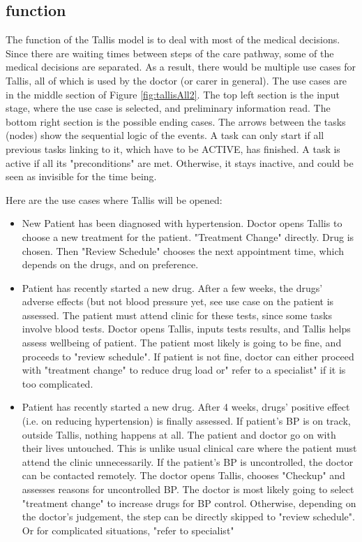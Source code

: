 \documentclass[11pt]{article}
\begin{document}
\subsection{function}
The function of the Tallis model is to deal with most of the medical decisions. Since there are waiting times between steps of the care pathway, some of the medical decisions are separated.  As a result, there would be multiple use cases for Tallis, all of which is used by the doctor (or carer in general). The use cases are in the middle section of Figure \ref{fig:tallisAll2}.  The top left section is the input stage, where the use case is selected, and preliminary information read.   The bottom right section is the possible ending cases. The arrows between the tasks (nodes) show the sequential logic of the events. A task can only start if all  previous tasks  linking to it, which have to be ACTIVE, has finished. A task is active if all its "preconditions" are met.  Otherwise, it stays inactive, and could be seen as invisible for the time being. 

Here are the use cases where Tallis will be opened:
\begin{itemize}
\item New Patient has been diagnosed with hypertension. Doctor opens Tallis to choose a new treatment for the patient.  "Treatment Change" directly.  Drug is chosen.  Then "Review Schedule" chooses the next appointment time, which depends on the drugs, and on preference.  

\item Patient has recently started a new drug.  After a few weeks, the drugs' adverse effects (but not blood pressure yet, see use case on the patient is assessed.  The patient must attend clinic for these tests, since some tasks involve blood tests.  Doctor opens Tallis, inputs tests results, and Tallis helps assess wellbeing of patient.  The patient most likely is going to be fine, and proceeds to "review schedule".  If patient is not fine, doctor can either proceed with "treatment change" to reduce drug load or" refer to a specialist" if it is too complicated.

\item Patient has recently started a new drug.  After 4 weeks, drugs' positive effect (i.e. on reducing hypertension) is finally assessed.  If patient's BP is on track, outside Tallis, nothing happens at all. The patient and doctor go on with their lives untouched. This is unlike usual clinical care where the patient must attend the clinic unnecessarily.  If the patient's BP is uncontrolled, the doctor can be contacted remotely. The doctor opens Tallis, chooses "Checkup" and assesses reasons for uncontrolled BP. The doctor is most likely going to select "treatment change" to increase drugs for BP control.  Otherwise, depending on the doctor's judgement, the step can be directly skipped to "review schedule". Or for complicated situations, "refer to specialist"
\end{itemize}
\end{document}
